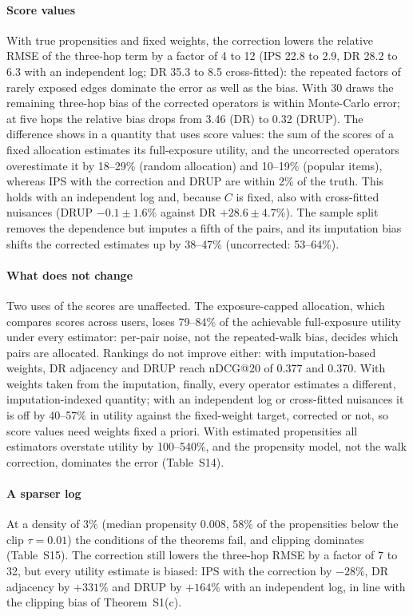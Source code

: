 \documentclass[preprint,review,12pt,authoryear]{elsarticle}
\theoremstyle{definition}
\begin{document}
\paragraph{Score values} With true propensities and fixed weights, the
correction lowers the relative RMSE of the three-hop term by a factor of 4 to
12 (IPS 22.8 to 2.9, DR 28.2 to 6.3 with an independent log; DR 35.3 to 8.5
cross-fitted): the repeated factors of rarely exposed edges dominate the error
as well as the bias. With 30 draws the remaining three-hop bias of the
corrected operators is within Monte-Carlo error; at five hops the relative
bias drops from 3.46 (DR) to 0.32 (DRUP). The difference shows in a quantity
that uses score values: the sum of the scores of a fixed allocation estimates its
full-exposure utility, and the uncorrected operators overestimate it by 18--29\% (random allocation) and 10--19\% (popular items),
whereas IPS with the correction and DRUP are within 2\% of the truth. This
holds with an independent log and, because $C$ is fixed, also with
cross-fitted nuisances (DRUP $-0.1\pm1.6\%$ against DR $+28.6\pm4.7\%$). The
sample split removes the dependence but imputes a fifth of the pairs, and its
imputation bias shifts the corrected estimates up by 38--47\% (uncorrected:
53--64\%).

\paragraph{What does not change} Two uses of the scores are unaffected. The
exposure-capped allocation, which compares scores across users, loses 79--84\%
of the achievable full-exposure utility under every estimator: per-pair noise,
not the repeated-walk bias, decides which pairs are allocated. Rankings do not
improve either: with imputation-based weights, DR adjacency and DRUP reach
nDCG@20 of 0.377 and 0.370. With weights taken from the imputation, finally,
every operator estimates a different, imputation-indexed quantity; with an
independent log or cross-fitted nuisances it is off by 40--57\% in utility
against the fixed-weight target, corrected or not, so score values need
weights fixed a priori. With estimated propensities all estimators
overstate utility by 100--540\%, and the propensity model, not the walk
correction, dominates the error (Table~S14).

\paragraph{A sparser log} At a density of 3\% (median propensity 0.008, 58\% of
the propensities below the clip $\tau=0.01$) the conditions of the theorems
fail, and clipping dominates (Table~S15). The correction
still lowers the three-hop RMSE by a factor of 7 to 32, but every utility
estimate is biased: IPS with the correction by $-28\%$, DR adjacency by $+331\%$
and DRUP by $+164\%$ with an independent log, in line with the clipping bias of
Theorem~S1(c).
\end{document}
